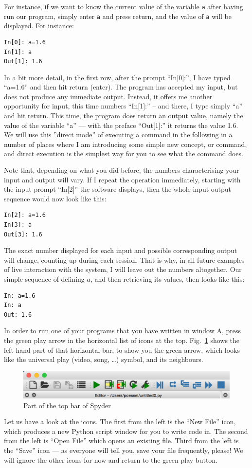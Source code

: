 \documentclass[twocolumn,apj]{openjournal}
\begin{document}
For instance, if we want to know the current value of the variable \verb|a| after having run our program, simply enter \verb|a| and press return, and the value of \verb|a| will be displayed. For instance:
\begin{lstlisting}
In[0]: a=1.6
In[1]: a
Out[1]: 1.6
\end{lstlisting}
In a bit more detail, in the first row, after the prompt ``In[0]:'', I have typed ``a=1.6'' and then hit return (enter). The program has accepted my input, but does not produce any immediate output. Instead, it offers me another opportunity for input, this time numbers ``In[1]:'' -- and there, I type simply ``a'' and hit return. This time, the program does return an output value, namely the value of the variable ``a'' --- with the preface ``Out[1]:'' it returns the value 1.6. We will use this ''direct mode'' of executing a command in the following in a number of places where I am introducing some simple new concept, or command, and direct execution is the simplest way for you to see what the command does.

Note that, depending on what you did before, the numbers characterising your input and output will vary. If I repeat the operation immediately, starting with the input prompt ``In[2]'' the software displays, then the whole input-output sequence would now look like this:
\begin{lstlisting}
In[2]: a=1.6
In[3]: a
Out[3]: 1.6
\end{lstlisting}
The exact number displayed for each input and possible corresponding output will change, counting up during each session. That is why, in all future examples of live interaction with the system, I will leave out the numbers altogether. Our simple sequence of defining $a$, and then retrieving its values, then looks like this:
\begin{lstlisting}
In: a=1.6
In: a
Out: 1.6
\end{lstlisting}

In order to run one of your programs that you have written in window A, press the green play arrow in the horizontal list of icons at the top. Fig.~\ref{SpyderTopBar} shows the left-hand part of that horizontal bar, to show you the green arrow, which looks like the universal play (video, song, \dots) symbol, and its neighbours.
\begin{figure}[htbp]
\begin{center}
\includegraphics[width=\linewidth]{play-arrow.jpg}
\caption{Part of the top bar of Spyder}
\label{SpyderTopBar}
\end{center}
\end{figure}
Let us have a look at the icons. The first from the left is the ``New File'' icon, which produces a new Python script window for you to write code in. The second from the left is ``Open File'' which opens an existing file. Third from the left is the ``Save'' icon --- as everyone will tell you, save your file frequently, please! We will ignore the other icons for now and return to the green play button.
\end{document}

